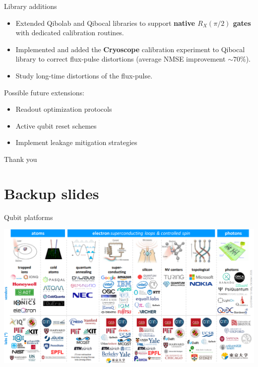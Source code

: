 \documentclass[aspectratio=169,10pt]{beamer}
\newcounter{mainframenumber}
\newcommand{\backupbegin}{
  \setcounter{mainframenumber}{\value{framenumber}}
}
\begin{document}
\begin{frame}{Library additions}
  \begin{itemize}
    \item[\ding{51}] Extended Qibolab and Qibocal libraries to support \textbf{native $R_X(\pi/2)$ gates} with dedicated calibration routines.
    \item[\ding{51}] Implemented and added the \textbf{Cryoscope} calibration experiment to Qibocal library to correct flux-pulse distortions (average NMSE improvement $\sim 70\%$).
    \item[\ding{55}] Study long-time distortions of the flux-pulse.
  \end{itemize}
  Possible future extensions: 
  \begin{itemize}[label={\raisebox{0.2ex}{\tiny$\bullet$}}]
    \item Readout optimization protocols
    \item Active qubit reset schemes
    \item Implement leakage mitigation strategies
  \end{itemize}
\end{frame}

\begin{frame}[t,standout]
\Large
Thank you
\end{frame}


\backupbegin
\appendix


\section*{Backup slides}

\begin{frame}{Qubit platforms}
  \begin{center}
      \includegraphics[height=0.82\textheight]{figures/platforms.png}
  \end{center}
\end{frame}
\end{document}
